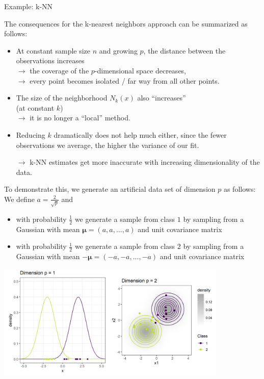 \documentclass[11pt,compress,t,notes=noshow, xcolor=table]{beamer}
\begin{document}
\begin{vbframe}{Example: k-NN}


The consequences for the k-nearest neighbors approach can be summarized as follows:

\begin{itemize}
 \item At constant sample size $n$ and growing $p$, the distance between the observations increases\\
 $\rightarrow$ the coverage of the $p$-dimensional space decreases,\\
 $\rightarrow$ every point becomes isolated / far way from all other points.
 \item The size of the neighborhood $N_k(x)$ also \enquote{increases}\\
       (at constant $k$) \\
       $\rightarrow$ it is no longer a \enquote{local} method.
 \item Reducing $k$ dramatically does not help much either,
since the fewer observations we average, the higher the variance of our fit.
 \item[$\rightarrow$] k-NN estimates get more inaccurate with increasing dimensionality of the data.
\end{itemize}

\framebreak

To demonstrate this, we generate an artificial data set of dimension $p$ as follows: We define $a = \frac{2}{\sqrt{p}}$ and 

\begin{itemize}
\item with probability $\frac{1}{2}$ we generate a sample from class $1$ by sampling from a Gaussian with mean $\pmb\mu = (a, a, ..., a)$ and unit covariance matrix
\item with probability $\frac{1}{2}$ we generate a sample from class $2$ by sampling from a  Gaussian with mean $- \pmb\mu = (-a, -a, ..., -a)$ and unit covariance matrix
\end{itemize}


\framebreak 

\begin{center}
\includegraphics[width = 11cm]{figure/knn_density_plot.png}
\end{center}


\end{vbframe}
\end{document}
